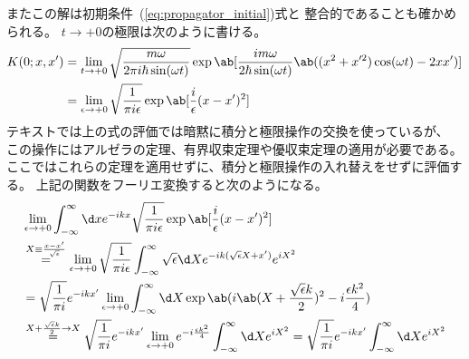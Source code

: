 またこの解は初期条件~(\ref{eq:propagator_initial})式と
整合的であることも確かめられる。
$t\to+0$の極限は次のように書ける。
\begin{equation}
  \begin{split}
    K(0;x,x')
    &=\lim_{t\to+0}\sqrt{\frac{m\omega}{2\pi i\hbar\sin(\omega t)}}
    \exp\ab[
      \frac{im\omega}{2\hbar\sin(\omega t)}
      \ab(
      (x^2+x'^2)\cos(\omega t) -2xx'
      )
    ] \\
    &=\lim_{\epsilon\to+0}
    \sqrt{\frac{1}{\pi i\epsilon}}
    \exp\ab[
      \frac{i}{\epsilon}(x-x')^2
    ]
  \end{split}
\end{equation}
テキストでは上の式の評価では暗黙に積分と極限操作の交換を使っているが、
この操作にはアルゼラの定理、有界収束定理や優収束定理の適用が必要である。
ここではこれらの定理を適用せずに、積分と極限操作の入れ替えをせずに評価する。
上記の関数をフーリエ変換すると次のようになる。
\begin{equation}
  \begin{split}
    &\lim_{\epsilon\to+0}
    \int_{-\infty}^\infty\d x
    e^{-ikx}
    \sqrt{\frac{1}{\pi i\epsilon}}
    \exp\ab[
      \frac{i}{\epsilon}(x-x')^2
    ] \\
    &\overset{X\equiv\frac{x-x'}{\sqrt{\epsilon}}}{=}
    \lim_{\epsilon\to+0}
    \sqrt{\frac{1}{\pi i\epsilon}}
    \int_{-\infty}^\infty\sqrt{\epsilon}\d X
    e^{-ik(\sqrt{\epsilon}X+x')}
    e^{iX^2} \\
    &=\sqrt{\frac{1}{\pi i}}
    e^{-ikx'}
    \lim_{\epsilon\to+0}
    \int_{-\infty}^\infty\d X
    \exp\ab(i\ab(X+\frac{\sqrt{\epsilon}k}{2})^2-i\frac{\epsilon k^2}{4}) \\
    &\overset{X+\frac{\sqrt{\epsilon}k}{2}\to X}{=}
    \sqrt{\frac{1}{\pi i}}
    e^{-ikx'}
    \lim_{\epsilon\to+0}
    e^{-i\frac{\epsilon k^2}{4}}
    \int_{-\infty}^\infty\d X
    e^{iX^2}
    =\sqrt{\frac{1}{\pi i}}
    e^{-ikx'}
    \int_{-\infty}^\infty\d X
    e^{iX^2}
  \end{split}
\end{equation}

